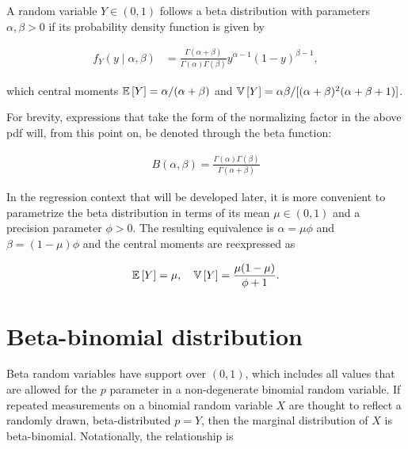 A random variable $Y \in (0,1)$ follows a beta distribution with parameters $\alpha, \beta > 0$ if its probability density function is given by

\begin{equation}
\begin{split}
f_{Y}(y \mid \alpha, \beta)
&= \frac{\Gamma(\alpha+\beta)}{\Gamma(\alpha)\Gamma(\beta)}y^{\alpha-1}(1-y)^{\beta-1},
\end{split}
\end{equation}

which central moments ${\mathbb E}\left[ Y \right] = \alpha / (\alpha+ \beta)$ and ${\mathbb V}\left[ Y \right] = \alpha \beta/[(\alpha+\beta)^2(\alpha+\beta+1)]$.

For brevity, expressions that take the form of the normalizing factor in the above pdf will, from this point on, be denoted through the beta function:

\begin{equation}
\label{beta-function}
\begin{split}
B(\alpha, \beta) = \frac{\Gamma(\alpha)\Gamma(\beta)}{\Gamma(\alpha+\beta)}
\end{split}
\end{equation}

In the regression context that will be developed later, it is more convenient to parametrize the beta distribution in terms of its mean $\mu \in (0,1)$ and a precision parameter $\phi > 0$. The resulting equivalence is  $\alpha = \mu\phi$ and $\beta = (1-\mu)\phi$ and the central moments are reexpressed as

\begin{equation}
\begin{split}
{\mathbb E}\left[ Y \right] = \mu, \quad {\mathbb V}\left[ Y \right] = \frac{\mu(1-\mu)}{\phi+1}.
\end{split}
\end{equation}

\section{Beta-binomial distribution}
\label{sec:bbin-dist}

Beta random variables have support over $(0,1)$, which includes all values that are allowed for the $p$ parameter in a non-degenerate binomial random variable. If repeated measurements on a binomial random variable $X$ are thought to reflect a randomly drawn, beta-distributed $p=Y$, then the marginal distribution of $X$ is beta-binomial. Notationally, the relationship is

